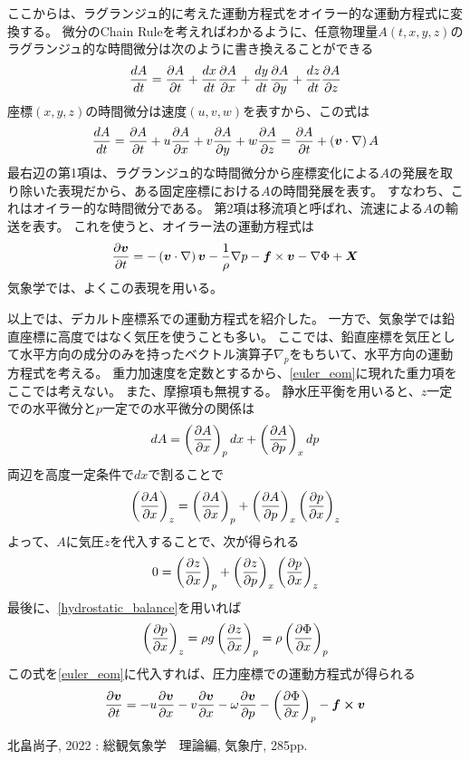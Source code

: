 \documentclass[a4paper,11pt,platex]{jsarticle}
\numberwithin{equation}{section}
\newcommand{\spartial}[2]{{\partial #1 \over \partial #2}}
\begin{document}
ここからは、ラグランジュ的に考えた運動方程式をオイラー的な運動方程式に変換する。
微分のChain Ruleを考えればわかるように、任意物理量$A\left(t, x, y, z\right)$のラグランジュ的な時間微分は次のように書き換えることができる
\begin{equation}
    {dA \over dt} = \spartial{A}{t} + {dx \over dt}\spartial{A}{x} + {dy \over dt}\spartial{A}{y} + {dz \over dt}\spartial{A}{z}
\end{equation}
座標$\left(x, y, z\right)$の時間微分は速度$\left(u, v, w\right)$を表すから、この式は
\begin{equation}
    {dA \over dt}
    = \spartial{A}{t} + u\spartial{A}{x} + v\spartial{A}{y} + w\spartial{A}{z}
    = \spartial{A}{t} + \left(\vb*{v} \cdot \nabla\right)A
\end{equation}
最右辺の第1項は、ラグランジュ的な時間微分から座標変化による$A$の発展を取り除いた表現だから、ある固定座標における$A$の時間発展を表す。
すなわち、これはオイラー的な時間微分である。
第2項は移流項と呼ばれ、流速による$A$の輸送を表す。
これを使うと、オイラー法の運動方程式は
\begin{equation}
    \label{euler_eom}
    \spartial{\vb*{v}}{t} = -\left(\vb*{v} \cdot \nabla\right)\vb*{v} -{1 \over \rho} \nabla p - \vb*{f} \times \vb*{v} - \nabla \Phi + \vb*{X}
\end{equation}
気象学では、よくこの表現を用いる。

以上では、デカルト座標系での運動方程式を紹介した。
一方で、気象学では鉛直座標に高度ではなく気圧を使うことも多い。
ここでは、鉛直座標を気圧として水平方向の成分のみを持ったベクトル演算子$\nabla_p$をもちいて、水平方向の運動方程式を考える。
重力加速度を定数とするから、\autoref{euler_eom}に現れた重力項をここでは考えない。
また、摩擦項も無視する。
静水圧平衡を用いると、$z$一定での水平微分と$p$一定での水平微分の関係は
\begin{equation}
    dA = \left(\spartial{A}{x}\right)_p dx + \left(\spartial{A}{p}\right)_x dp
\end{equation}
両辺を高度一定条件で$dx$で割ることで
\begin{equation}
    \left(\spartial{A}{x}\right)_z = \left(\spartial{A}{x}\right)_p + \left(\spartial{A}{p}\right)_x \left(\spartial{p}{x}\right)_z
\end{equation}
よって、$A$に気圧$z$を代入することで、次が得られる
\begin{equation}
    0 = \left(\spartial{z}{x}\right)_p + \left(\spartial{z}{p}\right)_x \left(\spartial{p}{x}\right)_z
\end{equation}
最後に、\autoref{hydrostatic_balance}を用いれば
\begin{equation}
    \left(\spartial{p}{x}\right)_z = \rho g \left(\spartial{z}{x}\right)_p = \rho \left(\spartial{\Phi}{x}\right)_p
\end{equation}
この式を\autoref{euler_eom}に代入すれば、圧力座標での運動方程式が得られる
\begin{equation}
    \spartial{\vb*{v}}{t} = -u\spartial{\vb*{v}}{x} - v\spartial{\vb*{v}}{x} - \omega\spartial{\vb*{v}}{p} - \left(\spartial{\Phi}{x}\right)_p - \vb*{f} \cross \vb*{v}
\end{equation}







\clearpage

\begin{thebibliography}{100}
    \item 北畠尚子, 2022 : 総観気象学　理論編, 気象庁, 285pp.
\end{thebibliography}
\end{document}

